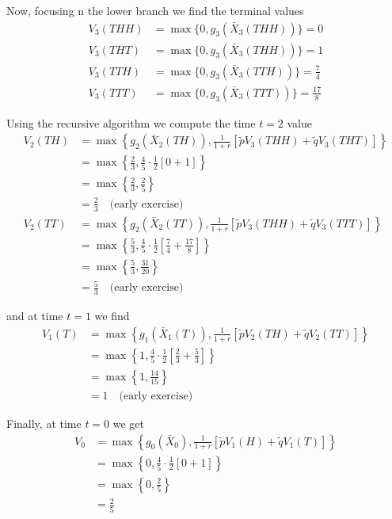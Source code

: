 \documentclass[12pt]{article}
\begin{document}
Now, focusing n the lower branch we find the terminal values
\begin{align*}
	V_3(THH) &= \max \{ 0, g_3(\bar{X}_3(THH))\} = 0 \\
	V_3(THT) &= \max \{ 0, g_3(\bar{X}_3(THH))\} = 1 \\
	V_3(TTH) &= \max \{ 0, g_3(\bar{X}_3(TTH))\} = \frac{7}{4} \\
	V_3(TTT) &= \max \{ 0, g_3(\bar{X}_3(TTT))\} = \frac{17}{8}
\end{align*}

Using the recursive algorithm we compute the time $t = 2$ value
\begin{align*}
	V_2(TH) &= \max \left\{ g_2(\bar{X}_2(TH)), \frac{1}{1 + r}\left[ \tilde{p} V_3(THH) + \tilde{q}V_3(THT)\right] \right\} \\
	&= \max \left\{ \frac{2}{3}, \frac{4}{5}\cdot\frac{1}{2}\left[ 0 + 1 \right] \right\} \\
	&= \max \left\{ \frac{2}{3}, \frac{2}{5} \right\} \\
	&= \frac{2}{3} \quad \text{(early exercise)} \\
	V_2(TT) &= \max \left\{ g_2(\bar{X}_2(TT)), \frac{1}{1 + r}\left[ \tilde{p} V_3(THH) + \tilde{q}V_3(TTT)\right] \right\} \\
	&= \max \left\{ \frac{5}{3}, \frac{4}{5}\cdot\frac{1}{2}\left[ \frac{7}{4} + \frac{17}{8} \right] \right\} \\ 
	&= \max \left\{ \frac{5}{3}, \frac{31}{20} \right\} \\
	&= \frac{5}{3} \quad \text{(early exercise)}
\end{align*}

and at time $t = 1$ we find
\begin{align*}
	V_1(T) &= \max \left\{ g_1(\bar{X}_1(T)), \frac{1}{1 + r}\left[ \tilde{p} V_2(TH) + \tilde{q}V_2(TT)\right] \right\} \\
	&= \max \left\{1, \frac{4}{5}\cdot\frac{1}{2}\left[ \frac{2}{3} + \frac{5}{3} \right] \right\} \\
	&= \max \left\{ 1, \frac{14}{15} \right\} \\
	&= 1 \quad \text{(early exercise)}
\end{align*}

Finally, at time $t = 0$ we get
\begin{align*}
	V_0 &= \max \left\{ g_0(\bar{X}_0), \frac{1}{1 + r}\left[ \tilde{p} V_1(H) + \tilde{q}V_1(T)\right] \right\} \\ 
	&= \max \left\{ 0, \frac{4}{5}\cdot\frac{1}{2}\left[ 0 + 1 \right] \right\} \\
	&= \max \left\{0, \frac{2}{5} \right\} \\
	&= \frac{2}{5}
\end{align*}
\end{document}
